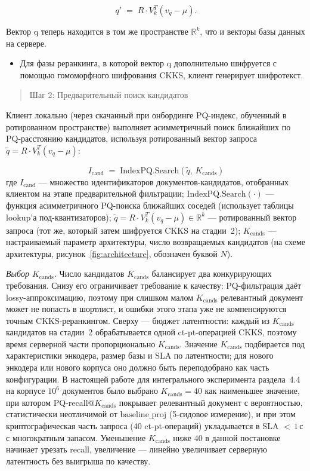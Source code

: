 \documentclass[a4paper, 12pt, oneside, openany]{article}
\begin{document}
\[
q' \;=\; R \cdot V_{k}^{T} (v_{q} - \mu).
\]

Вектор q\textquotesingle{} теперь находится в том же пространстве \(\mathbb{R}^{k}\), что и векторы базы данных на сервере.

\begin{itemize}
	\item
	Для фазы реранкинга, в которой вектор q\textquotesingle{} дополнительно шифруется с помощью гомоморфного шифрования CKKS, клиент генерирует шифротекст.
\end{itemize}

\begin{quote}
	Шаг 2: Предварительный поиск кандидатов
\end{quote}

Клиент локально (через скачанный при онбординге PQ-индекс, обученный в ротированном пространстве) выполняет асимметричный поиск ближайших по PQ-расстоянию кандидатов, используя ротированный вектор запроса $\tilde q = R \cdot V_k^{T}(v_q - \mu)$:

\begin{equation}
	I_{\mathrm{cand}} \;=\; \mathrm{IndexPQ.Search}(\tilde q,\, K_{\mathrm{cands}})
	\label{eq:4-5}
\end{equation}
где \(I_{\mathrm{cand}}\) --- множество идентификаторов документов-кандидатов, отобранных клиентом на этапе предварительной фильтрации; \(\mathrm{IndexPQ.Search}( \cdot )\) --- функция асимметричного PQ-поиска ближайших соседей (использует таблицы lookup'а под-квантизаторов); \(\tilde q = R \cdot V_k^{T}(v_q - \mu) \in \mathbb{R}^{k}\) --- ротированный вектор запроса (тот же, который затем шифруется CKKS на стадии~2); \(K_{\mathrm{cands}}\) --- настраиваемый параметр архитектуры, число возвращаемых кандидатов (на схеме архитектуры, рисунок~\ref{fig:architecture}, обозначен буквой $N$).

\emph{Выбор $K_{\mathrm{cands}}$.} Число кандидатов $K_{\mathrm{cands}}$ балансирует два конкурирующих требования. Снизу его ограничивает требование к качеству: PQ-фильтрация даёт lossy-аппроксимацию, поэтому при слишком малом $K_{\mathrm{cands}}$ релевантный документ может не попасть в шортлист, и ошибки этого этапа уже не компенсируются точным CKKS-реранкингом. Сверху --- бюджет латентности: каждый из $K_{\mathrm{cands}}$ кандидатов на стадии~2 обрабатывается одной ct-pt-операцией CKKS, поэтому время серверной части пропорционально $K_{\mathrm{cands}}$. Значение $K_{\mathrm{cands}}$ подбирается под характеристики энкодера, размер базы и SLA по латентности; для нового энкодера или нового корпуса оно должно быть переподобрано как часть конфигурации. В настоящей работе для интегрального эксперимента раздела~4.4 на корпусе $10^6$ документов было выбрано $K_{\mathrm{cands}} = 40$ как наименьшее значение, при котором PQ-recall@$K_{\mathrm{cands}}$ покрывает релевантный документ с вероятностью, статистически неотличимой от $\mathrm{baseline\_proj}$ (5-сидовое измерение), и при этом криптографическая часть запроса (40 ct-pt-операций) укладывается в SLA $<\,1$\,с с многократным запасом. Уменьшение $K_{\mathrm{cands}}$ ниже 40 в данной постановке начинает урезать recall, увеличение --- линейно увеличивает серверную латентность без выигрыша по качеству.
\end{document}
